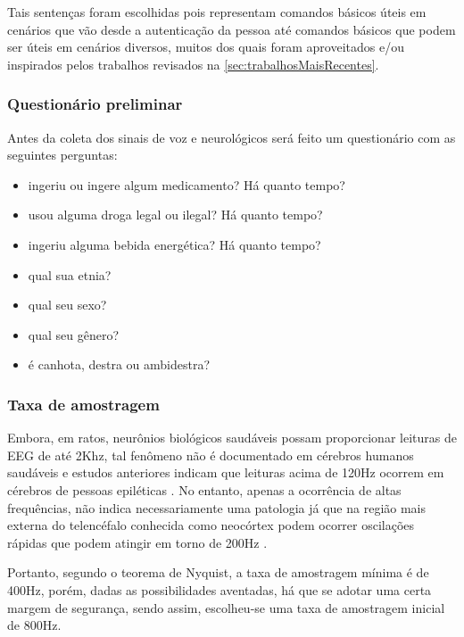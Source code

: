 			    \par Tais sentenças foram escolhidas pois representam comandos básicos úteis em cenários que vão desde a autenticação da pessoa até comandos básicos que podem ser úteis em cenários diversos, muitos dos quais foram aproveitados e/ou inspirados pelos trabalhos revisados na \autoref{sec:trabalhosMaisRecentes}.
		    
		    \subsubsection{Questionário preliminar}
		    
			    \par Antes da coleta dos sinais de voz e neurológicos será feito um questionário com as seguintes perguntas:
			    
			    \begin{itemize}
			    	\item ingeriu ou ingere algum medicamento? Há quanto tempo?
			    	\item usou alguma droga legal ou ilegal? Há quanto tempo?
			    	\item ingeriu alguma bebida energética? Há quanto tempo?
			    	\item qual sua etnia?
			    	\item qual seu sexo?
			    	\item qual seu gênero?
			    	\item é canhota, destra ou ambidestra?
			    \end{itemize}
			    
			\subsubsection{Taxa de amostragem}
			
				\par Embora, em ratos, neurônios biológicos saudáveis possam proporcionar leituras de EEG de até 2Khz, tal fenômeno não é documentado em cérebros humanos saudáveis e estudos anteriores indicam que leituras acima de 120Hz ocorrem em cérebros de pessoas epiléticas \cite{Moffett2017}. No entanto, apenas a ocorrência de altas frequências, não indica necessariamente uma patologia já que na região mais externa do telencéfalo conhecida como neocórtex podem ocorrer oscilações rápidas que podem atingir em torno de 200Hz \cite{hfreOscEngel}.
				
				\par Portanto, segundo o teorema de Nyquist, a taxa de amostragem mínima é de 400Hz, porém, dadas as possibilidades aventadas, há que se adotar uma certa margem de segurança, sendo assim, escolheu-se uma taxa de amostragem inicial de 800Hz.
				

